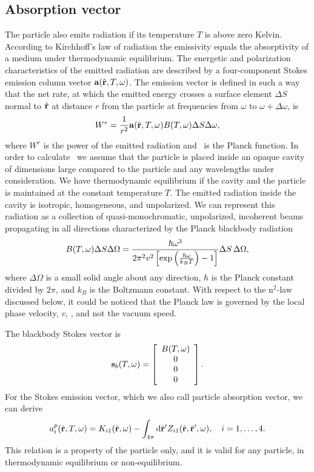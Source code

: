 \subsection{Absorption vector}
\label{sec:rtetheory:abs_vec}
The particle also emits radiation if its temperature $T$ is above zero
Kelvin. According to Kirchhoff's law of radiation the emissivity
equals the absorptivity of a medium under thermodynamic equilibrium.
The energetic and polarization characteristics of the emitted
radiation are described by a four-component Stokes emission column
vector ${\bf a}(\hat{\mathbf{r}}, T, \omega)$. The emission vector is
defined in such a way that the net rate, at which the emitted energy
crosses a surface element $\Delta S$ normal to $\hat{\mathbf{r}}$ at
distance $r$ from the particle at frequencies from $\omega$ to $\omega
+ \Delta\omega$, is
\begin{equation}
  W^e = \frac{1}{r^2}{\bf a}(\hat{\mathbf{r}}, T, \omega)
  B(T,\omega) \Delta S \Delta\omega,
\end{equation}
where $W^e$ is the power of the emitted radiation and \Planck\ is the
Planck function.  In order to calculate \AbsVec\ we assume that the
particle is placed inside an opaque cavity of dimensions large
compared to the particle and any wavelengths under consideration. We
have thermodynamic equilibrium if the cavity and the particle is
maintained at the constant temperature $T$. The emitted radiation
inside the cavity is isotropic, homogeneous, and unpolarized. We can
represent this radiation as a collection of quasi-monochromatic,
unpolarized, incoherent beams propagating in all directions
characterized by the Planck blackbody radiation
\begin{equation}
  \label{eq:rtetheory:Planck}
  B(T,\omega)\Delta S \Delta\Omega =
    \frac{\hbar\omega^3}{2\pi^2 v^2\left[\exp\left(\frac{\hbar\omega}{k_B T}
   \right) -1\right]}
     \Delta S \, \Delta\Omega,
\end{equation}
where $\Delta \Omega$ is a small solid angle about any direction, $\hbar$ is
the Planck constant divided by $2\pi$, and $k_B$ is the Boltzmann constant.
With respect to the n$^2$-law discussed below, it could be noticed that the
Planck law is governed by the local phase velocity, $v$, \citep[see
e.g.][]{thomas2002radiative}, and not the vacuum speed.

The blackbody Stokes vector is
\begin{equation}
  {\bf s}_b(T, \omega) = \left[ \begin{array}{c} B(T,\omega)\\ 0 \\ 0 \\ 0 \end{array} \right].
\end{equation}
For the Stokes emission vector, which we also call particle absorption
vector, we can derive
\begin{equation}
  \label{eq:rtetheory:abs_vec}
  a_i^p(\hat{\mathbf{r}}, T, \omega) =
  K_{i1}(\hat{\mathbf{r}},\omega) - \int_{4\pi} \mathrm{d}\hat{\mathbf{r}}' Z_{i1}(\hat{\mathbf{r}}, \hat{\mathbf{r}}', \omega) ,
 \quad i = 1,\ldots,4. 
\end{equation}
This relation is a property of the particle only, and it is valid for
any particle, in thermodynamic equilibrium or non-equilibrium.


